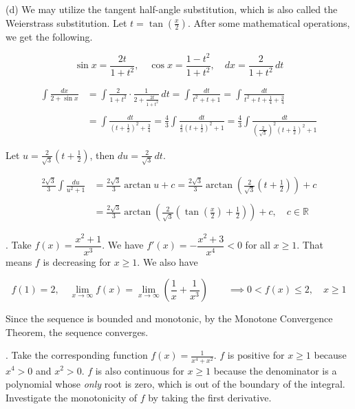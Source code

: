 \documentclass{article}
\begin{document}
\noindent (d) We may utilize the tangent half-angle substitution, which is also called the Weierstrass substitution. Let $\displaystyle t=\tan\left(\frac x2\right)$. After some mathematical operations, we get the following.

\[\sin x={\frac{2t}{1+t^{2}}},\quad\cos x={\frac{1-t^{2}}{1+t^{2}}},\quad dx={\frac2{1+t^{2}}}\,dt\]

\begin{align*}\int\frac{dx}{2+\sin x}&=\int\frac2{1+t^2}\cdot\frac1{2+\frac{2t}{1+t^2}}\,dt=\int\frac{dt}{t^2+t+1}=\int\frac{dt}{t^2+t+\frac14+\frac34}\\\\&=\int\frac{dt}{\left(t+\frac12\right)^2+\frac34}=\frac43\int\frac{dt}{\frac43\left(t+\frac12\right)^2+1}=\frac43\int\frac{dt}{\left(\frac2{\sqrt3}\right)^2\left(t+\frac12\right)^2+1}\end{align*}

\hfill

\noindent Let $\displaystyle u=\frac2{\sqrt3}\left(t+\frac12\right)$, then $\displaystyle du=\frac2{\sqrt3}\,dt$.

\begin{align*}\frac{2\sqrt3}3\int\frac{du}{u^2+1}&=\frac{2\sqrt3}3\arctan u+c=\frac{2\sqrt3}3\arctan\left(\frac2{\sqrt3}\left(t+\frac12\right)\right)+c\\\\&=\boxed{\frac{2\sqrt3}3\arctan\left(\frac2{\sqrt3}\left(\tan\left(\frac x2\right)+\frac12\right)\right)+c,\quad c\in\mathbb{R}}\end{align*}

\hfill

. Take $f(x)=\dfrac{x^2+1}{x^3}$. We have $f'(x)=-\dfrac{x^2+3}{x^4}<0$ for all $x\geq1$. That means $f$ is decreasing for $x\geq1$. We also have

\[f(1)=2,\quad \lim_{x\to\infty}f(x)=\lim_{x\to\infty}\left(\frac1x +\frac1{x^3}\right)\qquad \implies0<f(x)\leq2,\quad x\geq1\]

\hfill

\noindent Since the sequence is bounded and monotonic, by the Monotone Convergence Theorem, the sequence converges.

\hfill

. Take the corresponding function $\displaystyle f(x)=\frac1{x^4+x^2}$. $f$ is positive for $x\geq1$ because $x^4>0$ and $x^2>0$. $f$ is also continuous for $x\geq1$ because the denominator is a polynomial whose \textit{only} root is zero, which is out of the boundary of the integral. Investigate the monotonicity of $f$ by taking the first derivative.
\end{document}
